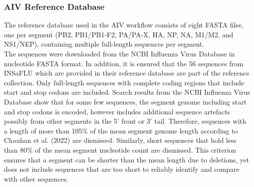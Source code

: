 \subsubsection{AIV Reference Database}\label{sec:3-aiv-ref}
The reference database used in the \ac{AIV} workflow consists of eight FASTA files, one per segment (PB2, PB1/PB1-F2, PA/PA-X, HA, NP, NA, M1/M2, and NS1/NEP), containing multiple full-length sequences per segment.\\
The sequences were downloaded from the \ac{NCBI} Influenza Virus Database in nucleotide FASTA format. In addition, it is ensured that the 56 sequences from \ac{INSaFLU} which are provided in their reference database are part of the reference collection. Only full-length sequences with complete coding regions that include start and stop codons are included. Search results from the \ac{NCBI} Influenza Virus Database show that for some few sequences, the segment genome including start and stop codons is encoded, however includes additional sequence artefacts possibly from other segments in the 5' front or 3' tail. Therefore, sequences with a length of more than 105\% of the mean segment genome length according to Chauhan et al. (2022) are dismissed. Similarly, short sequences that hold less than 80\% of the mean segment nucleotide count are dismissed. This criterion ensures that a segment can be shorter than the mean length due to deletions, yet does not include sequences that are too short to reliably identify and compare with other sequences.\\
